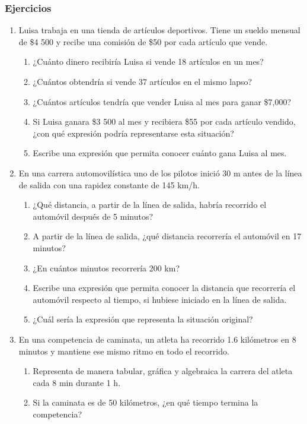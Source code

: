 \documentclass[11pt]{book}
\begin{document}
\subsubsection{Ejercicios}
\begin{enumerate}

  \item Luisa trabaja en una tienda de artículos deportivos. Tiene un sueldo mensual de \$4 500 y recibe una comisión
        de \$50 por cada artículo que vende.
        \begin{enumerate}
          \item ¿Cuánto dinero recibiría Luisa si vende 18 artículos en un mes?
          \item  ¿Cuántos obtendría si vende 37 artículos en el mismo lapso?
          \item  ¿Cuántos artículos tendría que vender Luisa al mes para ganar \$7,000?
          \item Si Luisa ganara \$3 500 al mes y recibiera \$55 por cada artículo vendido,
                ¿con qué expresión podría representarse esta situación?
          \item Escribe una expresión que permita conocer cuánto gana Luisa al mes.
        \end{enumerate}
  \item En una carrera automovilística uno de los pilotos inició 30 m antes de la línea de salida con una rapidez constante de 145 km/h.
        \begin{enumerate}
          \item ¿Qué distancia, a partir de la línea de salida, habría recorrido el automóvil después de 5 minutos?
          \item A partir de la línea de salida, ¿qué distancia recorrería el automóvil en 17 minutos?
          \item ¿En cuántos minutos recorrería 200 km?
          \item Escribe una expresión que permita conocer la distancia que recorrería el automóvil respecto al
                tiempo, si hubiese iniciado en la línea de salida.
          \item ¿Cuál sería la expresión que representa la situación original?
        \end{enumerate}

  \item En una competencia de caminata, un atleta ha recorrido 1.6 kilómetros en 8 minutos y mantiene ese mismo ritmo en todo el recorrido.
        \begin{enumerate}
          \item Representa de manera tabular, gráfica y algebraica la carrera del atleta cada 8 min durante 1 h.
          \item Si la caminata es de 50 kilómetros, ¿en qué tiempo termina la competencia?
        \end{enumerate}

\end{enumerate}
\newpage
\end{document}
